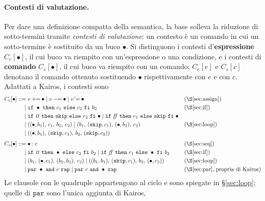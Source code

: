 \paragraph{Contesti di valutazione.} Per dare una definizione compatta della
semantica, la base solleva la riduzione di sotto-termini tramite
\emph{contesti di valutazione}: un contesto è un comando in cui un
sotto-termine è sostituito da un buco $\bullet$. Si distinguono i contesti
d'\textbf{espressione} $C_e[\bullet]$, il cui buco va riempito con
un'espressione o una condizione, e i contesti di \textbf{comando}
$C_s[\bullet]$, il cui buco va riempito con un comando; $C_e[e]$ e $C_s[c]$
denotano il comando ottenuto sostituendo $\bullet$ rispettivamente con $e$ e
con $c$. Adattati a Kairos, i contesti sono
{\footnotesize
\[
\begin{aligned}
C_e[\bullet] ::={}&
  v \mathbin{+\!\!=} \bullet \mid v \mathbin{-\!\!=} \bullet \mid v \mathbin{\hat{}\!=} \bullet
  && \text{(\S\ref{sec:assign})}\\
 \mid{}& \mathtt{if}\ \bullet\ \mathtt{then}\ c_1\ \mathtt{else}\ c_2\ \mathtt{fi}\ b_2
  && \text{(\S\ref{sec:if})}\\
 \mid{}& \mathtt{if}\ \ttt\ \mathtt{then}\ \mathtt{skip}\ \mathtt{else}\ c_2\ \mathtt{fi}\ \bullet
  \mid \mathtt{if}\ \ff\ \mathtt{then}\ c_1\ \mathtt{else}\ \mathtt{skip}\ \mathtt{fi}\ \bullet & \\
 \mid{}& ((\bullet,b_1),\, c_1,\, b_2,\, c_2)
  \mid (b_1,\, (\mathtt{skip},c_1),\, (\bullet,b_2),\, c_2)
  && \text{(\S\ref{sec:loop})}\\
 \mid{}& ((\bullet,b_1),\, (\mathtt{skip},c_1),\, b_2,\, (\mathtt{skip},c_2)) & \\[0.4em]
C_s[\bullet] ::={}& \bullet\,;\,c
  && \text{(\S\ref{sec:seq})}\\
 \mid{}& \mathtt{if}\ \ttt\ \mathtt{then}\ \bullet\ \mathtt{else}\ c_2\ \mathtt{fi}\ b_2
  \mid \mathtt{if}\ \ff\ \mathtt{then}\ c_1\ \mathtt{else}\ \bullet\ \mathtt{fi}\ b_2
  && \text{(\S\ref{sec:if})}\\
 \mid{}& (b_1,\, (\bullet,c_1),\, (b_2,b_2),\, c_2)
  \mid ((b_1,b_1),\, (\mathtt{skip},c_1),\, b_2,\, (\bullet,c_2))
  && \text{(\S\ref{sec:loop})}\\
 \mid{}& \mathtt{par}\ \bullet\ \mathtt{and}\ c\ \mathtt{rap}
  \mid \mathtt{par}\ c\ \mathtt{and}\ \bullet\ \mathtt{rap}
  && \text{(\S\ref{sec:par}, propria di Kairos)}
\end{aligned}
\]
}
Le clausole con le quadruple appartengono al ciclo e sono spiegate in
\S\ref{sec:loop}; quelle di $\mathtt{par}$ sono l'unica aggiunta di Kairos,
